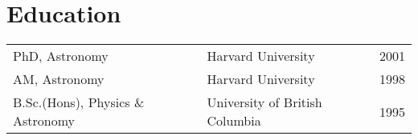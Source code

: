 \documentclass[12pt]{article}
\begin{document}
\maketitle

\section{Education}
\begin{tabular}{lll}
PhD, Astronomy & Harvard University & 2001\\
AM, Astronomy & Harvard University & 1998\\
B.Sc.(Hons),  Physics \& Astronomy & University of British Columbia&1995\\
\end{tabular}


\begin{publications}

\printbibliography[title={Refereed publications},keyword=ref]

\setcounter{papers}{0}
\printbibliography[title={Conference presentations},keyword=unref]


\end{publications}
\end{document}
